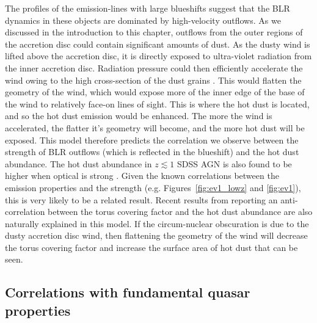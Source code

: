 The profiles of the emission-lines with large  blueshifts suggest that the BLR dynamics in these objects are dominated by high-velocity outflows. 
As we discussed in the introduction to this chapter, outflows from the outer regions of the accretion disc could contain significant amounts of dust. 
As the dusty wind is lifted above the accretion disc, it is directly exposed to ultra-violet radiation from the inner accretion disc. 
Radiation pressure could then efficiently accelerate the wind owing to the high cross-section of the dust grains \citep[e.g.][]{fabian12}.  
This would flatten the geometry of the wind, which would expose more of the inner edge of the base of the wind to relatively face-on lines of sight. 
This is where the hot dust is located, and so the hot dust emission would be enhanced. 
The more the wind is accelerated, the flatter it's geometry will become, and the more hot dust will be exposed.
This model therefore predicts the correlation we observe between the strength of BLR outflows (which is reflected in the  blueshift) and the hot dust abundance. 
The hot dust abundance in $z\lesssim1$ SDSS AGN is also found to be higher when optical  is strong \citep{shen14}. 
Given the known correlations between the  emission properties and the  strength (e.g. Figures~\ref{fig:ev1_lowz} and \ref{fig:ev1}), this is very likely to be a related result. 
Recent results from \citet{roseboom13} reporting an anti-correlation between the torus covering factor and the hot dust abundance are also naturally explained in this model.
If the circum-nuclear obscuration is due to the dusty accretion disc wind, then flattening the geometry of the wind will decrease the torus covering factor and increase the surface area of hot dust that can be seen. 

\subsection{Correlations with fundamental quasar properties}

